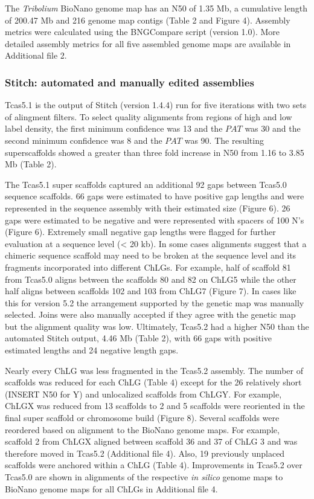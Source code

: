 \documentclass{bmcart}
\begin{document}
The \textit{Tribolium} BioNano genome map has an N50 of 1.35 Mb, a cumulative length of 200.47 Mb and 216 genome map contigs (Table 2 and Figure 4). Assembly metrics were calculated using the BNGCompare script (version 1.0). More detailed assembly metrics for all five assembled genome maps are available in Additional file 2.

\subsubsection*{Stitch: automated and manually edited assemblies}

Tcas5.1 is the output of Stitch (version 1.4.4) run for five iterations with two sets of alingment filters. To select quality alignments from regions of high and low label density, the first minimum confidence was 13 and the $PAT$ was 30 and the second minimum confidence was 8 and the $PAT$ was 90. The resulting superscaffolds showed a greater than three fold increase in N50 from 1.16 to 3.85 Mb (Table 2). 

The Tcas5.1 super scaffolds captured an additional 92 gaps between Tcas5.0 sequence scaffolds. 66 gaps were estimated to have positive gap lengths and were represented in the sequence assembly with their estimated size (Figure 6). 26 gaps were estimated to be negative and were represented with spacers of 100 N's (Figure 6). Extremely small negative gap lengths were flagged for further evaluation at a sequence level (< 20 kb). In some cases alignments suggest that a chimeric sequence scaffold may need to be broken at the sequence level and its fragments incorporated into different ChLGs. For example, half of scaffold 81 from Tcas5.0 aligns between the scaffolds 80 and 82 on ChLG5 while the other half aligns between scaffolds 102 and 103 from ChLG7 (Figure 7). In cases like this for version 5.2 the arrangement supported by the genetic map was manually selected. Joins were also manually accepted if they agree with the genetic map but the alignment quality was low. Ultimately, Tcas5.2 had a higher N50 than the automated Stitch output, 4.46 Mb (Table 2), with 66 gaps with positive estimated lengths and 24 negative length gaps. 

Nearly every ChLG was less fragmented in the Tcas5.2 assembly. The number of scaffolds was reduced for each ChLG (Table 4) except for the 26 relatively short (INSERT N50 for Y) and unlocalized scaffolds from ChLGY. For example, ChLGX was reduced from 13 scaffolds to 2 and 5 scaffolds were reoriented in the final super scaffold or chromosome build (Figure 8). Several scaffolds were reordered based on alignment to the BioNano genome maps. For example, scaffold 2 from ChLGX aligned between scaffold 36 and 37 of ChLG 3 and was therefore moved in Tcas5.2 (Additional file 4). Also, 19 previously unplaced scaffolds were anchored within a ChLG (Table 4). Improvements in Tcas5.2 over Tcas5.0 are shown in alignments of the respective \textit{in silico} genome maps to BioNano genome maps  for all ChLGs in Additional file 4.
\end{document}
